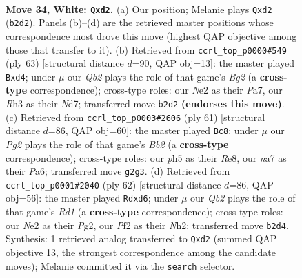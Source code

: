 \documentclass[11pt]{article}
\begin{document}
\clearpage

\begin{figure}[p]\centering
\begin{subfigure}{0.46\textwidth}\centering
\resizebox{\linewidth}{!}{%
\newchessgame
\chessboard[
  setfen={1r6/n3rk2/p2p2p1/3P3p/Rpq1p2P/7R/1Q1bNPP1/5K2 w - - 0 34},
  showmover=false,
  pgfstyle=straightmove, color=movearrow, markmove={b2-d2}
]}
\caption{}
\end{subfigure}\hfill
\begin{subfigure}{0.46\textwidth}\centering
\resizebox{\linewidth}{!}{%
\newchessgame
\chessboard[
  setfen={4r1k1/p2n1pb1/P1rp2p1/3N3p/3QP3/R6P/3B1PP1/4R1K1 b - - 0 32},
  showmover=false,
  pgfstyle=straightmove, color=movearrow, markmove={g7-d4}
]}
\caption{}
\end{subfigure}
\\[4pt]
\begin{subfigure}{0.46\textwidth}\centering
\resizebox{\linewidth}{!}{%
\newchessgame
\chessboard[
  setfen={4r1k1/1b5p/p1pq3B/3r2P1/1P1P1pQ1/8/P1R2P2/3R2K1 b - - 0 31},
  showmover=false,
  pgfstyle=straightmove, color=movearrow, markmove={b7-c8}
]}
\caption{}
\end{subfigure}\hfill
\begin{subfigure}{0.46\textwidth}\centering
\resizebox{\linewidth}{!}{%
\newchessgame
\chessboard[
  setfen={5r2/1p1rq1kp/1R1p2p1/P7/4pn2/Q6P/5PPN/3R2K1 w - - 2 32},
  showmover=false,
  pgfstyle=straightmove, color=movearrow, markmove={d1-d6}
]}
\caption{}
\end{subfigure}
\caption{\textbf{Move 34, White: \texttt{Qxd2}.} (a) Our position; Melanie plays \texttt{Qxd2} (\texttt{b2d2}). Panels (b)--(d) are the retrieved master positions whose correspondence most drove this move (highest QAP objective among those that transfer to it). (b) Retrieved from \texttt{ccrl\_top\_p0000\#549} (ply 63) [structural distance $d$=90, QAP obj=13]: the master played \texttt{Bxd4}; under $\mu$ our \emph{Qb2} plays the role of that game's \emph{Bg2} (a \textbf{cross-type} correspondence); cross-type roles: our \emph{N}e2 as their \emph{P}a7, our \emph{R}h3 as their \emph{N}d7; transferred move \texttt{b2d2} \textbf{(endorses this move)}. (c) Retrieved from \texttt{ccrl\_top\_p0003\#2606} (ply 61) [structural distance $d$=86, QAP obj=60]: the master played \texttt{Bc8}; under $\mu$ our \emph{Pg2} plays the role of that game's \emph{Bb2} (a \textbf{cross-type} correspondence); cross-type roles: our \emph{p}h5 as their \emph{R}e8, our \emph{n}a7 as their \emph{P}a6; transferred move \texttt{g2g3}. (d) Retrieved from \texttt{ccrl\_top\_p0001\#2040} (ply 62) [structural distance $d$=86, QAP obj=56]: the master played \texttt{Rdxd6}; under $\mu$ our \emph{Qb2} plays the role of that game's \emph{Rd1} (a \textbf{cross-type} correspondence); cross-type roles: our \emph{N}e2 as their \emph{P}g2, our \emph{P}f2 as their \emph{N}h2; transferred move \texttt{b2d4}. Synthesis: 1 retrieved analog transferred to \texttt{Qxd2} (summed QAP objective 13, the strongest correspondence among the candidate moves); Melanie committed it via the \texttt{search} selector.}
\label{fig:thought-m66}
\end{figure}
\end{document}
